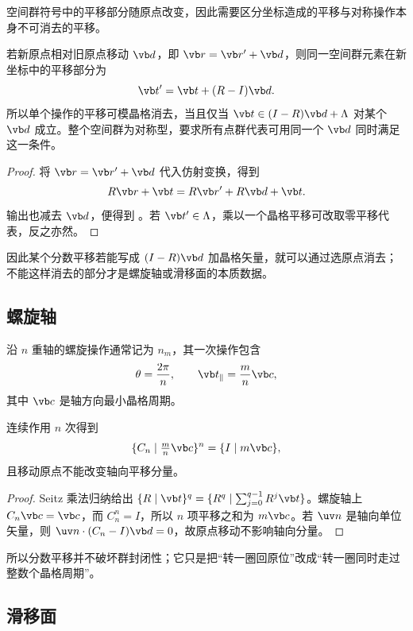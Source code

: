 空间群符号中的平移部分随原点改变，因此需要区分坐标造成的平移与对称操作本身不可消去的平移。
\begin{proposition}
若新原点相对旧原点移动 $\vb d$，即 $\vb r=\vb r'+\vb d$，则同一空间群元素在新坐标中的平移部分为
\begin{equation}
\vb t' = \vb t+(R-I)\vb d.
\label{eq:origin-shift-seitz-app}
\end{equation}
所以单个操作的平移可模晶格消去，当且仅当 $\vb t\in(I-R)\vb d+\Lambda$ 对某个 $\vb d$ 成立。整个空间群为对称型，要求所有点群代表可用同一个 $\vb d$ 同时满足这一条件。
\end{proposition}
\begin{proof}
将 $\vb r=\vb r'+\vb d$ 代入仿射变换，得到
\[
R\vb r+\vb t
=R\vb r'+R\vb d+\vb t.
\]
输出也减去 $\vb d$，便得到 。若 $\vb t'\in\Lambda$，乘以一个晶格平移可改取零平移代表，反之亦然。
\end{proof}
因此某个分数平移若能写成 $(I-R)\vb d$ 加晶格矢量，就可以通过选原点消去；不能这样消去的部分才是螺旋轴或滑移面的本质数据。

\subsection{螺旋轴}

\begin{definition}[螺旋轴]
沿 $n$ 重轴的螺旋操作通常记为 $n_m$，其一次操作包含
\[
\theta=\frac{2\pi}{n},
\qquad
\vb t_{\parallel}=\frac{m}{n}\vb c,
\]
其中 $\vb c$ 是轴方向最小晶格周期。
\end{definition}
\begin{proposition}[螺旋操作的整数幂]
连续作用 $n$ 次得到
\[
\{C_n\mid \tfrac{m}{n}\vb c\}^n
=\{I\mid m\vb c\},
\]
且移动原点不能改变轴向平移分量。
\end{proposition}
\begin{proof}
Seitz 乘法归纳给出 $\{R\mid\vb t\}^q=\{R^q\mid\sum_{j=0}^{q-1}R^j\vb t\}$。螺旋轴上 $C_n\vb c=\vb c$，而 $C_n^n=I$，所以 $n$ 项平移之和为 $m\vb c$。若 $\uv n$ 是轴向单位矢量，则 $\uv n\cdot(C_n-I)\vb d=0$，故原点移动不影响轴向分量。
\end{proof}
所以分数平移并不破坏群封闭性；它只是把“转一圈回原位”改成“转一圈同时走过整数个晶格周期”。

\subsection{滑移面}

